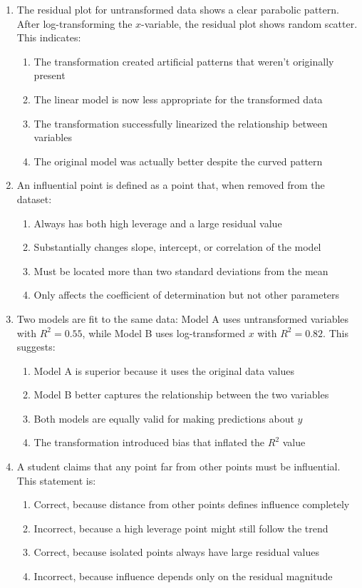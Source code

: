 \documentclass[11pt]{article}
\begin{document}
\begin{enumerate}
\item The residual plot for untransformed data shows a clear parabolic pattern. After log-transforming the $x$-variable, the residual plot shows random scatter. This indicates:
\begin{enumerate}[label=(\Alph*)]
\item The transformation created artificial patterns that weren't originally present
\item The linear model is now less appropriate for the transformed data
\item The transformation successfully linearized the relationship between variables
\item The original model was actually better despite the curved pattern
\end{enumerate}

\item An influential point is defined as a point that, when removed from the dataset:
\begin{enumerate}[label=(\Alph*)]
\item Always has both high leverage and a large residual value
\item Substantially changes slope, intercept, or correlation of the model
\item Must be located more than two standard deviations from the mean
\item Only affects the coefficient of determination but not other parameters
\end{enumerate}

\item Two models are fit to the same data: Model A uses untransformed variables with $R^2 = 0.55$, while Model B uses log-transformed $x$ with $R^2 = 0.82$. This suggests:
\begin{enumerate}[label=(\Alph*)]
\item Model A is superior because it uses the original data values
\item Model B better captures the relationship between the two variables
\item Both models are equally valid for making predictions about $y$
\item The transformation introduced bias that inflated the $R^2$ value
\end{enumerate}

\item A student claims that any point far from other points must be influential. This statement is:
\begin{enumerate}[label=(\Alph*)]
\item Correct, because distance from other points defines influence completely
\item Incorrect, because a high leverage point might still follow the trend
\item Correct, because isolated points always have large residual values
\item Incorrect, because influence depends only on the residual magnitude
\end{enumerate}


\end{enumerate}
\end{document}
